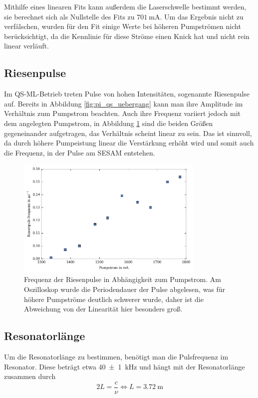 \documentclass[11pt,twoside=semi]{scrartcl}
\begin{document}
Mithilfe eines linearen Fits kann außerdem die Laserschwelle bestimmt werden, sie berechnet sich als
Nullstelle des Fits zu $\SI{701}{\milli\ampere}$. Um das Ergebnis nicht zu verfälschen, wurden für 
den Fit einige Werte bei höheren Pumpströmen nicht berücksichtigt, da die Kennlinie für diese
Ströme einen Knick hat und nicht rein linear verläuft.

\subsection{Riesenpulse}
Im QS-ML-Betrieb treten Pulse von hohen Intensitäten, sogenannte Riesenpulse auf.
Bereits in Abbildung \ref{fig:pi_qs_uebergang} kann man ihre Amplitude im Verhältnis
zum Pumpstrom beachten.
Auch ihre Frequenz variiert jedoch mit dem angelegten Pumpstrom, in Abbildung 
\ref{fig:freq_riesenpulse} sind die beiden Größen gegeneinander aufgetragen, 
das Verhältnis scheint linear zu sein. Das ist sinnvoll, da durch höhere
Pumpeistung linear die Verstärkung erhöht wird und somit auch die Frequenz,
in der Pulse am SESAM entstehen.

\begin{figure}[H]
  \centering
  \includegraphics[width=0.8\textwidth]{./figures/freq_riesenpulse.pdf}
  \caption{Frequenz der Riesenpulse in Abhängigkeit zum Pumpstrom. Am Oszilloskop wurde die 
  Periodendauer der Pulse abgelesen, was für höhere Pumpströme deutlich schwerer wurde, 
  daher ist die Abweichung von der Linearität hier besonders groß.}
  \label{fig:freq_riesenpulse}
\end{figure}

\subsection{Resonatorlänge}
Um die Resonatorlänge zu bestimmen, benötigt man die Pulsfrequenz im Resonator. Diese beträgt
etwa \SI{40 \pm 1}{\kilo\hertz} und hängt mit der Resonatorlänge zusammen durch
\begin{equation}
2L = \frac{c}{\nu} \Leftrightarrow L = \SI{3.72}{\metre}
\end{equation}
\end{document}
